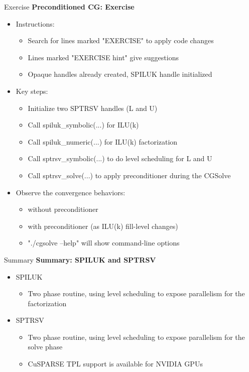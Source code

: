 \begin{frame}[fragile]{Exercise}
\textbf{Preconditioned CG: Exercise}
\begin{itemize}

  \item Instructions:
  \begin{itemize}
    \item Search for lines marked "EXERCISE" to apply code changes
    \item Lines marked "EXERCISE hint" give suggestions
    \item Opaque handles already created, SPILUK handle initialized
  \end{itemize}
  \item Key steps:
  \begin{itemize}
    \item Initialize two SPTRSV handles (L and U)
    \item Call spiluk\_symbolic(...) for ILU(k)
    \item Call spiluk\_numeric(...) for ILU(k) factorization
    \item Call sptrsv\_symbolic(...) to do level scheduling for L and U
    \item Call sptrsv\_solve(...) to apply preconditioner during the CGSolve
  \end{itemize}
  \item Observe the convergence behaviors:
  \begin{itemize}
    \item  without preconditioner 
    \item  with preconditioner (as ILU(k) fill-level changes)
    \item  "./cgsolve --help" will show command-line options
  \end{itemize}

\end{itemize}
\end{frame}


\begin{frame}[fragile]{Summary}
\textbf{Summary: SPILUK and SPTRSV}
\begin{itemize}
  \item SPILUK
  \begin{itemize}
    \item Two phase routine, using level scheduling to expose parallelism for the factorization
  \end{itemize}
  \item SPTRSV
  \begin{itemize}
    \item Two phase routine, using level scheduling to expose parallelism for the solve phase
    \item CuSPARSE TPL support is available for NVIDIA GPUs
  \end{itemize}
\end{itemize}

\end{frame}


